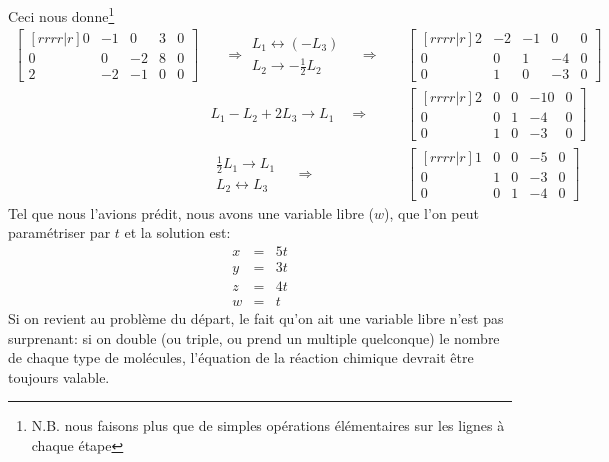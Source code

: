 Ceci nous donne\footnote{N.B. nous faisons plus que de simples
opérations élémentaires sur les lignes à chaque étape}
\[
\begin{matrix}
\begin{bmatrix}[rrrr|r]
0 & -1 & 0 & 3 & 0 \\
0 & 0  & -2 & 8 & 0 \\
2 & -2 & -1 & 0 & 0
\end{bmatrix}
& \quad\Rightarrow
\begin{matrix}
L_1 \leftrightarrow (-L_3) \\
L_2 \rightarrow -\frac12 L_2
\end{matrix}
\quad\Rightarrow\quad&
\begin{bmatrix}[rrrr|r]
2 & -2 & -1 & 0 & 0\\
0 & 0  & 1 & -4 & 0 \\
0 & 1 & 0 & -3 & 0
\end{bmatrix} \\
&
L_1 - L_2 +2L_3\rightarrow L_1 
\quad\Rightarrow\quad&
\begin{bmatrix}[rrrr|r]
2 & 0 & 0 & -10 & 0\\
0 & 0  & 1 & -4 & 0 \\
0 & 1 & 0 & -3 & 0
\end{bmatrix} \\
&\begin{matrix}
\frac12 L_1 \rightarrow L_1 \\
L_2 \leftrightarrow L_3
\end{matrix} \quad\Rightarrow\quad &
\begin{bmatrix}[rrrr|r]
1 & 0 & 0 & -5 & 0\\
0 & 1  & 0 & -3 & 0 \\
0 & 0 & 1 & -4 & 0
\end{bmatrix}
\end{matrix}
\]
Tel que nous l'avions prédit, nous avons une variable libre ($w$), que l'on peut paramétriser par $t$
et la solution est:
\[
\begin{matrix}
x &=& 5t \\
y &=& 3t \\
z &=& 4t \\
w &=& t
\end{matrix}
\]
Si on revient au problème du départ, le fait qu'on ait une variable libre
n'est pas surprenant: si on double (ou triple, ou prend un multiple quelconque)
le nombre de chaque type de molécules, l'équation de la réaction chimique devrait
être toujours valable.

